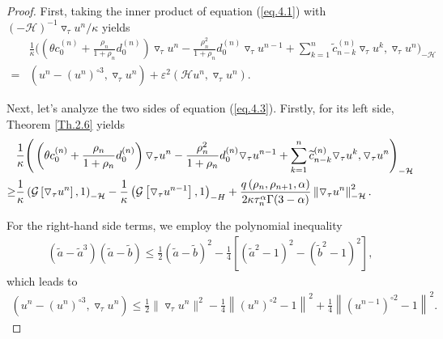 \documentclass{siamart171218}
\theoremstyle{remark}
\theoremstyle{example}
\numberwithin{equation}{section}
\begin{document}
\begin{proof}
First, taking the inner product of equation (\ref{eq.4.1}) with $(-\mathcal{H})^{-1}\triangledown_\tau u^n/\kappa$ yields
\begin{equation}\label{eq.4.3}
\begin{aligned}
&\frac{1}{\kappa} \Bigg( \left( \theta c_{0}^{(n)}+ \frac{\rho_{n}}{1+\rho_{n}}d_{0}^{(n)} \right) \triangledown_\tau u^{n} - \frac{\rho_{n}^2}{1+\rho_{n}}d_{0}^{(n)} \triangledown_\tau u^{n-1}
+ \sum\limits_{k=1}^{n} \widetilde{c}_{n-k}^{(n)} \triangledown_\tau u^{k}, \triangledown_\tau u^n \Bigg)_{-\mathcal{H}} \\
= &\left(u^{n}- \left(u^{n} \right)^{\circ 3}, \triangledown_\tau u^n \right) + \varepsilon^2 \left(\mathcal{H} u^n, \triangledown_\tau u^n \right).
\end{aligned}
\end{equation}

	Next, let's analyze the two sides of equation (\ref{eq.4.3}). Firstly, for its left side, Theorem \ref{Th.2.6} yields
	\begin{equation}\label{eq.4.4}
		\begin{aligned}\displaystyle
			&\frac{1}{\kappa} \Bigg{(} \left( \theta c_{0}^{(n)}+  \frac{\rho_{n}}{1+\rho_{n}}d_{0}^{(n)} \right) \triangledown_\tau u^{n}-\frac{\rho_{n}^2}{1+\rho_{n}}d_{0}^{(n)} \triangledown_\tau u^{n-1}  +\sum\limits_{k=1}^{n} \widetilde{c}_{n-k}^{(n)} \triangledown_\tau u^{k},\triangledown_\tau u^n \Bigg{)}_{-\mathcal{H}} \\
		\ge	&\frac{1}{\kappa}\left(\mathcal{G}
\left[\triangledown_\tau u^n\right],1\right)_{-\mathcal{H}} -\frac{1}{\kappa}\left(\mathcal{G}\left[\triangledown_\tau
 u^{n-1}\right],1\right)_{-H} +\frac{q\left(\rho_n,\rho_{n+1},\alpha\right)}{2\kappa \tau_{n}^\alpha \Gamma(3-\alpha)}\left\|\triangledown_\tau u^{n}\right\|_{-\mathcal{H}}^2.
		\end{aligned}
	\end{equation}

For the right-hand side terms, we employ the polynomial inequality
\begin{align*}
\left(\widetilde{a}-\widetilde{a}^3\right)\left(\widetilde{a}-\widetilde{b}\right) \leq \frac{1}{2}(\widetilde{a}-\widetilde{b})^2 - \frac{1}{4}\left[ \left(\widetilde{a}^2-1\right)^2-\left(\widetilde{b}^2-1\right)^2\right],
\end{align*}
which leads to
\begin{align*}
	\left(u^{n}- \left(u^{n} \right)^{\circ 3}, \triangledown_\tau u^n \right) \leq \frac{1}{2}\|\triangledown_\tau u^n\|^2 - \frac{1}{4} \left\| \left(u^{n}\right)^{\circ 2}-1 \right\|^2 + \frac{1}{4} \left\| \left(u^{n-1}\right)^{\circ 2}-1 \right\|^2.
\end{align*}


\end{proof}
\end{document}
